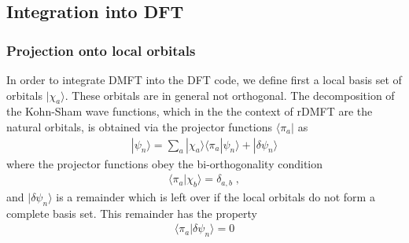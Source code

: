 \documentclass[11pt,a4paper]{report}
\begin{document}
\subsection{Integration into DFT}
\subsubsection{Projection onto local orbitals}
In order to integrate DMFT into the DFT code, we define first a local
basis set of orbitals $|\chi_a\rangle$. These orbitals are in general
not orthogonal. The decomposition of the Kohn-Sham wave functions,
which in the the context of rDMFT are the natural orbitals, is
obtained via the projector functions $\langle\pi_a|$ as
\begin{eqnarray}
|\psi_n\rangle=\sum_a|\chi_a\rangle\langle\pi_a|\psi_n\rangle
+|\delta\psi_n\rangle
\end{eqnarray}
where the projector functions obey the bi-orthogonality condition
\begin{eqnarray}
\langle\pi_a|\chi_b\rangle=\delta_{a,b}\;,
\end{eqnarray}
and $|\delta\psi_n\rangle$ is a remainder which is left over if the
local orbitals do not form a complete basis set. This remainder has
the property
\begin{eqnarray}
\langle\pi_a|\delta\psi_n\rangle=0
\end{eqnarray}

\end{document}
